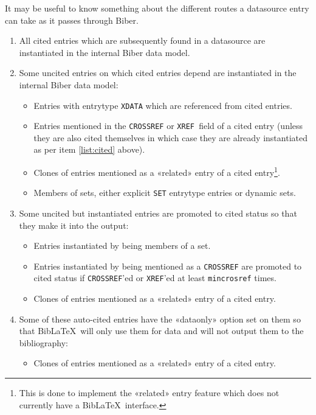 \documentclass{ltxdockit}
\begin{document}
It may be useful to know something about the different routes a datasource
entry can take as it passes through Biber.

\begin{enumerate}
\item\label{list:cited} All cited entries which are subsequently found in a
  datasource are instantiated in the internal Biber data model.
\item Some uncited entries on which cited entries depend are
  instantiated in the internal Biber data model:
  \begin{itemize}
  \item Entries with entrytype \verb+XDATA+ which are referenced from cited
    entries.
    \item Entries mentioned in the \verb+CROSSREF+ or \verb+XREF +field of a cited entry
      (unless they are also cited themselves in which case they are already
      instantiated as per item \ref{list:cited} above).
      \item Clones of entries mentioned as a «related» entry of a cited
        entry\footnote{This is done to 
          implement the «related» entry feature which does not currently
          have a Bib\LaTeX\ interface.}.
      \item Members of sets, either explicit \verb+SET+ entrytype entries or
        dynamic sets.
  \end{itemize}
\item Some uncited but instantiated entries are promoted to cited
  status so that they make it into the output:
  \begin{itemize}
  \item Entries instantiated by being members of a set.
  \item Entries instantiated by being mentioned as a \verb+CROSSREF+ are
    promoted to cited status if \verb+CROSSREF+'ed or \verb+XREF+'ed at
    least \verb+mincrosref+ times.
  \item Clones of entries mentioned as a «related» entry of a cited entry.
  \end{itemize}
\item Some of these auto-cited entries have the «dataonly» option set on
  them so that Bib\LaTeX\ will only use them for data and will not output
  them to the bibliography:
  \begin{itemize}
  \item Clones of entries mentioned as a «related» entry of a cited entry.
  \end{itemize}
\end{enumerate}
\end{document}
